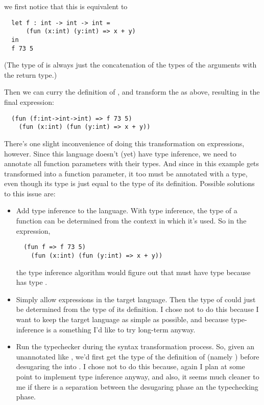 \documentclass[pageno]{jpaper}
\begin{document}
{{{\begin{itemize}
we first notice that this is equivalent to

\begin{lstlisting}
  let f : int -> int -> int =
      (fun (x:int) (y:int) => x + y)
  in
  f 73 5
\end{lstlisting}

(The type of  is always just the concatenation of the types of the arguments with the return type.)

Then we can curry the definition of , and transform the  as above, resulting in
the final expression:

\begin{lstlisting}
  (fun (f:int->int->int) => f 73 5)
    (fun (x:int) (fun (y:int) => x + y))
\end{lstlisting}
\end{itemize}

There's one slight inconvenience of doing this transformation on  expressions, however.
Since this language doesn't (yet) have type inference, we need to annotate all function parameters
with their types. And since  in this example gets transformed into a function parameter,
it too must be annotated with a type, even though its type is just equal to the type of its definition.
Possible solutions to this issue are:

\begin{itemize}
\item Add type inference to the language. With type inference, the type of a function
can be determined from the context in which it's used. So in the expression,

\begin{lstlisting}
  (fun f => f 73 5)
    (fun (x:int) (fun (y:int) => x + y))
\end{lstlisting}

the type inference algorithm would figure out that  must have type  because
 has type .
\item Simply allow  expressions in the target language.  Then the type of  could
just be determined from the type of its definition. I chose not to do this because I want to keep the
target language as simple as possible, and because type-inference is a something I'd like to try long-term
anyway.

\item Run the typechecker during the syntax transformation process. So, given an unannotated 
like , we'd first get the type of the definition of  (namely )
before desugaring the  into . I chose not to do this because, again I plan at some point to implement type inference
anyway, and also, it seems much cleaner to me if there is a separation between the desugaring phase an the
typechecking phase.
\end{itemize}

}}}
\end{document}

